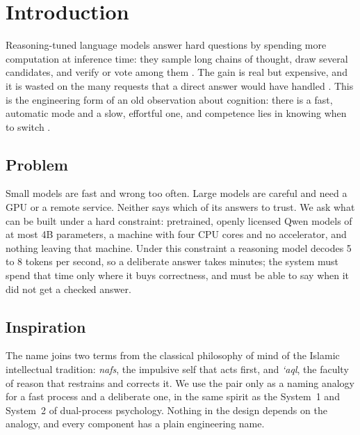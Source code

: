 \section{Introduction}
\label{sec:intro}

Reasoning-tuned language models answer hard questions by spending more
computation at inference time: they sample long chains of thought, draw several
candidates, and verify or vote among them
\cite{wei2022cot,wang2023selfconsistency,snell2024scaling,deepseek2025r1}. The
gain is real but expensive, and it is wasted on the many requests that a direct
answer would have handled \cite{chen2024overthinking,zhang2025adaptthink}. This
is the engineering form of an old observation about cognition: there is a fast,
automatic mode and a slow, effortful one, and competence lies in knowing when to
switch \cite{kahneman2011thinking,evans2013dual,sloman1996two}.

\subsection{Problem}
Small models are fast and wrong too often. Large models are careful and need a
GPU or a remote service. Neither says which of its answers to trust. We ask what
can be built under a hard constraint: pretrained, openly licensed Qwen models of
at most 4B parameters, a machine with four CPU cores and no accelerator, and
nothing leaving that machine. Under this constraint a reasoning model decodes
5 to 8 tokens per second, so a deliberate answer takes minutes; the system must
spend that time only where it buys correctness, and must be able to say when it
did not get a checked answer.

\subsection{Inspiration}
The name joins two terms from the classical philosophy of mind of the Islamic
intellectual tradition: \emph{nafs}, the impulsive self that acts first, and
\emph{\textquoteleft aql}, the faculty of reason that restrains and corrects it.
We use the pair only as a naming analogy for a fast process and a deliberate
one, in the same spirit as the System~1 and System~2 of dual-process
psychology. Nothing in the design depends on the analogy, and every component
has a plain engineering name.

